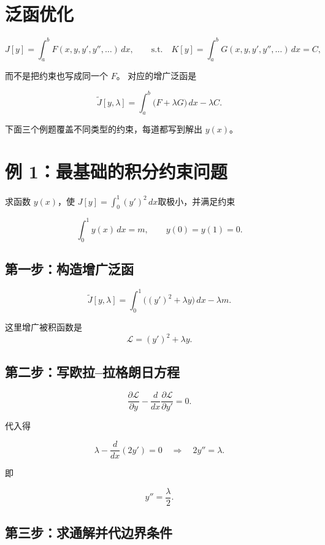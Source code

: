 \section{泛函优化}

\[
J[y]=\int_a^b F(x,y,y',y'',\dots)\,dx,
\qquad
\text{s.t.}\quad
K[y]=\int_a^b G(x,y,y',y'',\dots)\,dx=C,
\]

而不是把约束也写成同一个 \(F\)。
对应的增广泛函是

\[
\tilde J[y,\lambda]
=\int_a^b \big(F+\lambda G\big)\,dx-\lambda C .
\]

下面三个例题覆盖不同类型的约束，每道都写到解出 \(y(x)\)。

\section{例 1：最基础的积分约束问题}

求函数 \(y(x)\)，使 \(J[y]=\int_0^1 (y')^2\,dx\)取极小，并满足约束

\[
\int_0^1 y(x)\,dx=m,
\qquad
y(0)=y(1)=0.
\]

\subsection{第一步：构造增广泛函}

\[
\tilde J[y,\lambda]=\int_0^1 \Big((y')^2+\lambda y\Big)\,dx-\lambda m.
\]

这里增广被积函数是\[
\mathcal L=(y')^2+\lambda y.
\]

\subsection{第二步：写欧拉–拉格朗日方程}

\[
\frac{\partial \mathcal L}{\partial y}
-
\frac{d}{dx}\frac{\partial \mathcal L}{\partial y'}
=0.
\]

代入得

\[
\lambda-\frac{d}{dx}(2y')=0
\quad\Longrightarrow\quad
2y''=\lambda.
\]

即

\[
y''=\frac{\lambda}{2}.
\]

\subsection{第三步：求通解并代边界条件}

